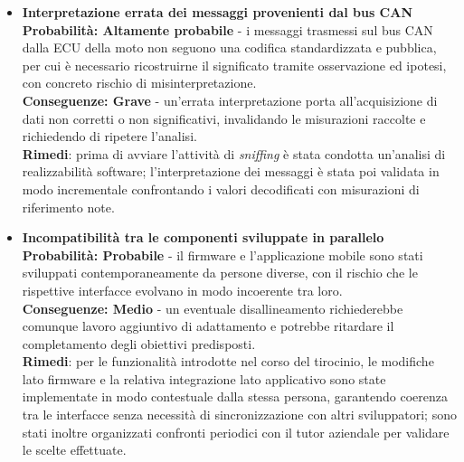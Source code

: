 \begin{itemize}
    \item \textbf{Interpretazione errata dei messaggi provenienti dal bus CAN}\\
    \textbf{Probabilità: Altamente probabile} - i messaggi trasmessi sul bus CAN dalla ECU della
    moto non seguono una codifica standardizzata e pubblica, per cui è necessario ricostruirne il
    significato tramite osservazione ed ipotesi, con concreto rischio di misinterpretazione.\\
    \textbf{Conseguenze: Grave} - un'errata interpretazione porta all'acquisizione di dati non
    corretti o non significativi, invalidando le misurazioni raccolte e richiedendo di ripetere
    l'analisi.\\
    \textbf{Rimedi}: prima di avviare l'attività di \textit{sniffing} è stata condotta un'analisi
    di realizzabilità software; l'interpretazione dei messaggi è stata poi validata in modo
    incrementale confrontando i valori decodificati con misurazioni di riferimento note.

    \item \textbf{Incompatibilità tra le componenti sviluppate in parallelo}\\
    \textbf{Probabilità: Probabile} - il firmware e l'applicazione mobile sono stati sviluppati
    contemporaneamente da persone diverse, con il rischio che le rispettive interfacce evolvano in
    modo incoerente tra loro.\\
    \textbf{Conseguenze: Medio} - un eventuale disallineamento richiederebbe comunque lavoro
    aggiuntivo di adattamento e potrebbe ritardare il completamento degli obiettivi predisposti.\\
    \textbf{Rimedi}: per le funzionalità introdotte nel corso del tirocinio, le modifiche lato
    firmware e la relativa integrazione lato applicativo sono state implementate in modo
    contestuale dalla stessa persona, garantendo coerenza tra le interfacce senza necessità di
    sincronizzazione con altri sviluppatori; sono stati inoltre organizzati confronti periodici
    con il tutor aziendale per validare le scelte effettuate.

\end{itemize}
